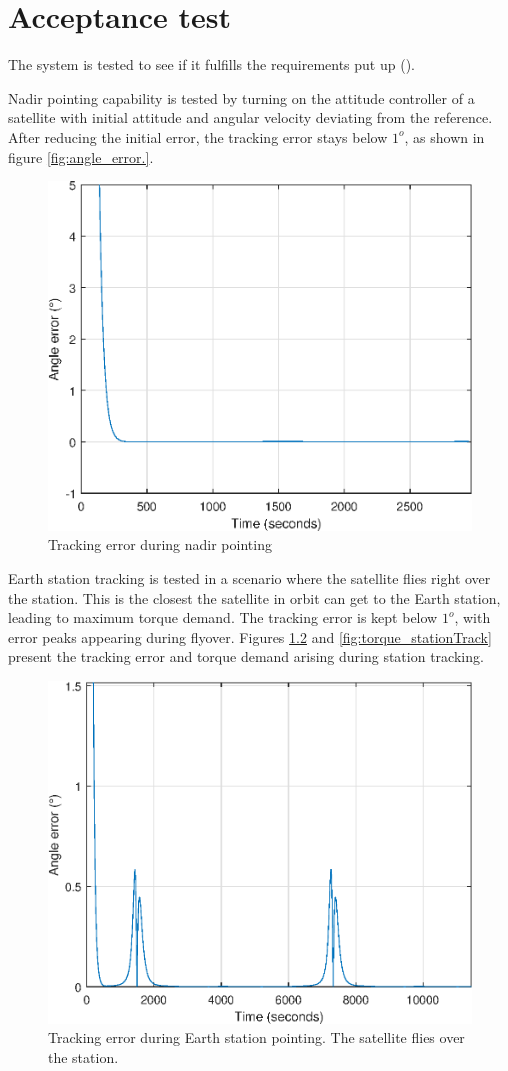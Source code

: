 \chapter{Acceptance test} \label{chap:acceptanceTest}

The system is tested to see if it fulfills the requirements put up ().

Nadir pointing capability is tested by turning on the attitude controller of a satellite with initial attitude and angular velocity deviating from the reference. After reducing the initial error, the tracking error stays below $1^o$, as shown in figure \ref{fig:angle_error.}.

\begin{figure}[H]
	\centering
	\includegraphics[width=0.7\linewidth]{figures/angle_error}
	\caption{Tracking error during nadir pointing}
	\label{fig:angle_error}
\end{figure}

Earth station tracking is  tested in a scenario where the satellite flies right over the station. This is the closest the satellite in orbit can get to the Earth station, leading to maximum torque demand. The tracking error is kept below  $1^o$, with error peaks appearing during flyover. Figures \ref{fig:angle_error2} and \ref{fig:torque_stationTrack} present the tracking error and torque demand arising during station tracking.

\begin{figure}[H]
	\centering
	\includegraphics[width=0.7\linewidth]{figures/angle_error_stationTrack}
	\caption{Tracking error during Earth station pointing. The satellite flies over the station.}
	\label{fig:angle_error2}
\end{figure}


